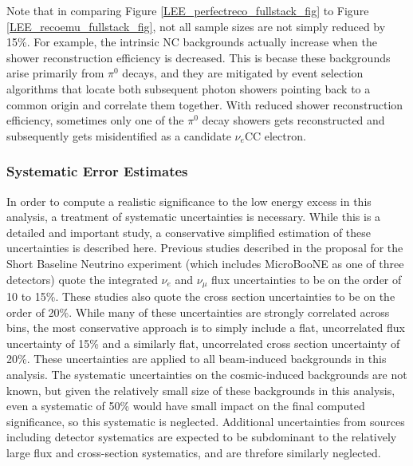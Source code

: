 Note that in comparing Figure \ref{LEE_perfectreco_fullstack_fig} to Figure \ref{LEE_recoemu_fullstack_fig}, not all sample sizes are not simply reduced by 15\%. For example, the intrinsic NC backgrounds actually increase when the shower reconstruction efficiency is decreased. This is becase these backgrounds arise primarily from $\pi^0$ decays, and they are mitigated by event selection algorithms that locate both subsequent photon showers pointing back to a common origin and correlate them together. With reduced shower reconstruction efficiency, sometimes only one of the $\pi^0$ decay showers gets reconstructed and subsequently gets misidentified as a candidate $\nu_e$CC electron.

\subsubsection{Systematic Error Estimates}

In order to compute a realistic significance to the low energy excess in this analysis, a treatment of systematic uncertainties is necessary. While this is a detailed and important study, a conservative simplified estimation of these uncertainties is described here. Previous studies described in the proposal for the Short Baseline Neutrino experiment (which includes MicroBooNE as one of three detectors) \cite{SBNproposal} quote the integrated $\nu_e$ and $\nu_\mu$ flux uncertainties to be on the order of 10 to 15\%. These studies also quote the cross section uncertainties to be on the order of 20\%. While many of these uncertainties are strongly correlated across bins, the most conservative approach is to simply include a flat, uncorrelated flux uncertainty of 15\% and a similarly flat, uncorrelated cross section uncertainty of 20\%. These uncertainties are applied to all beam-induced backgrounds in this analysis. The systematic uncertainties on the cosmic-induced backgrounds are not known, but given the relatively small size of these backgrounds in this analysis, even a systematic of 50\% would have small impact on the final computed significance, so this systematic is neglected. Additional uncertainties from sources including detector systematics are expected to be subdominant to the relatively large flux and cross-section systematics, and are threfore similarly neglected.\\

